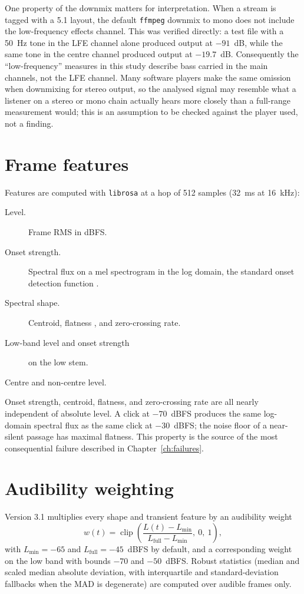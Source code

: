 One property of the downmix matters for interpretation. When a stream is tagged with a 5.1 layout, the default \texttt{ffmpeg} downmix to mono does not include the low-frequency effects channel. This was verified directly: a test file with a 50~Hz tone in the LFE channel alone produced output at $-91$~dB, while the same tone in the centre channel produced output at $-19.7$~dB. Consequently the ``low-frequency'' measures in this study describe bass carried in the main channels, not the LFE channel. Many software players make the same omission when downmixing for stereo output, so the analysed signal may resemble what a listener on a stereo or mono chain actually hears more closely than a full-range measurement would; this is an assumption to be checked against the player used, not a finding.

\section{Frame features}

Features are computed with \texttt{librosa} \citep{mcfee2015} at a hop of 512 samples (32~ms at 16~kHz):

\begin{description}
\item[Level.] Frame RMS in dBFS.
\item[Onset strength.] Spectral flux on a mel spectrogram in the log domain, the standard onset detection function \citep{bello2005}.
\item[Spectral shape.] Centroid, flatness \citep{johnston1988}, and zero-crossing rate.
\item[Low-band level and onset strength] on the low stem.
\item[Centre and non-centre level.]
\end{description}

Onset strength, centroid, flatness, and zero-crossing rate are all nearly independent of absolute level. A click at $-70$~dBFS produces the same log-domain spectral flux as the same click at $-30$~dBFS; the noise floor of a near-silent passage has maximal flatness. This property is the source of the most consequential failure described in Chapter~\ref{ch:failures}.

\section{Audibility weighting}

Version 3.1 multiplies every shape and transient feature by an audibility weight
\begin{equation}
w(t) = \operatorname{clip}\!\left(\frac{L(t) - L_{\min}}{L_{\text{full}} - L_{\min}},\ 0,\ 1\right),
\end{equation}
with $L_{\min}=-65$ and $L_{\text{full}}=-45$~dBFS by default, and a corresponding weight on the low band with bounds $-70$ and $-50$~dBFS. Robust statistics (median and scaled median absolute deviation, with interquartile and standard-deviation fallbacks when the MAD is degenerate) are computed over audible frames only.


